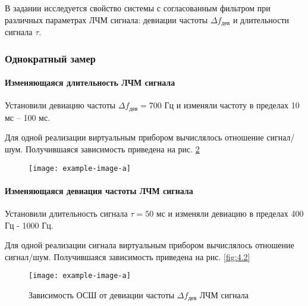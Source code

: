 В задании исследуется свойство системы с согласованным фильтром при различных
параметрах ЛЧМ сигнала: девиации частоты $\Delta f_{\text{дев}}$ и длительности
сигнала $\tau$.

\subsubsection{Однократный замер}%
\label{ssub:odnokratnyi_zamer}



\paragraph{Изменяющаяся длительность ЛЧМ сигнала}%
\label{par:izmeniaiushchaiasia_dlitel_nost_signala_tau_}

Установили девиацию частоты $\Delta f_{\text{дев}}= 700$ Гц и изменяли частоту
в пределах 10 мс -- 100 мс. 

Для одной реализации виртуальным прибором
вычислялось отношение сигнал/шум. Получившаяся зависимость приведена на рис.
\ref{fig:4.1}

\begin{figure}[h!]
    \centering
    \texttt{[image: example-image-a]}
    \caption{}
    \label{fig:4.1}
\end{figure}

\paragraph{Изменяющаяся девиация частоты ЛЧМ сигнала}%
\label{par:izmeniaiushchaiasia_deviatsiia_chastoty_signala}
Установили длительность сигнала $\tau=50$ мс и изменяли девиацию в пределах
400 Гц - 1000 Гц.

Для одной реализации сигнала виртуальным прибором
вычислялось отношение сигнал/шум. Получившаяся зависимость приведена на рис.
\ref{fig:4.2}

\begin{figure}[h!]
    \centering
    \texttt{[image: example-image-a]}
    \caption{Зависимость ОСШ от девиации частоты $\Delta f_{\text{дев}}$ ЛЧМ
    сигнала}
    \label{fig:4.1}
\end{figure}




